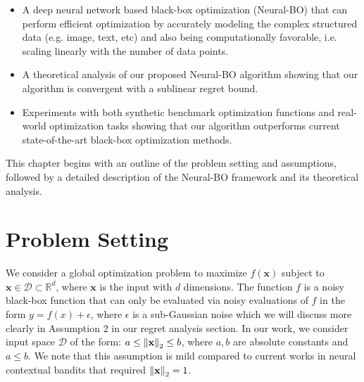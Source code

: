 \begin{itemize}
    \item A deep neural network based black-box optimization (Neural-BO) that can perform efficient optimization by accurately modeling the complex structured data (e.g. image, text, etc) and also being computationally favorable, i.e. scaling linearly with the number of data points.
    \item A theoretical analysis of our proposed Neural-BO algorithm showing that our algorithm is convergent with a sublinear regret bound. 
    \item Experiments with both synthetic benchmark optimization functions and real-world optimization tasks showing that our algorithm outperforms current state-of-the-art black-box optimization methods.
\end{itemize} 

This chapter begins with an outline of the problem setting and assumptions, followed by a detailed description of the Neural-BO framework and its theoretical analysis. 


\section{Problem Setting}
\label{section:neural-bo_problem_setting}
We consider a global optimization problem to maximize $f(\mathbf{x})$ subject to $\mathbf{x} \in \mathcal D \subset \mathbb{R}^d$, where $\mathbf{x}$ is the input with $d$ dimensions. The function $f$ is a noisy black-box function that can only be evaluated via noisy evaluations of $f$ in the form  $y= f(x) + \epsilon$, where $\epsilon$ is a sub-Gaussian noise which we will discuss more clearly in Assumption 2 in our regret analysis section. In our work, we consider input space $\mathcal D$ of the form: $a \leq \norm{\mathbf{x}}_2 \leq  b$,  where $a, b$ are absolute constants and $a \le b$. We note that this assumption is mild compared to current works in neural contextual bandits \citep{zhou2020neural,zhang2021neural,xu2020neural,kassraie2022neural} that required $\norm{\mathbf{x}}_2 = 1$.  


